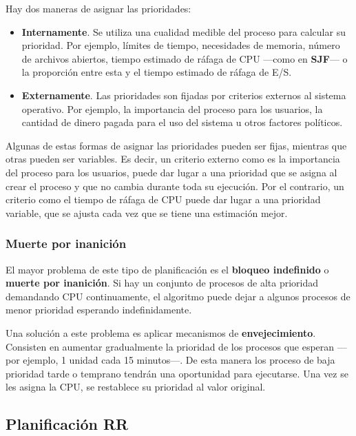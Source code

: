 Hay dos maneras de asignar las prioridades:

\begin{itemize}
\item
  \textbf{Internamente}. Se utiliza una cualidad medible del proceso
  para calcular su prioridad. Por ejemplo, límites de tiempo,
  necesidades de memoria, número de archivos abiertos, tiempo estimado
  de ráfaga de CPU ---como en \textbf{SJF}--- o la proporción entre esta
  y el tiempo estimado de ráfaga de E/S.
\item
  \textbf{Externamente}. Las prioridades son fijadas por criterios
  externos al sistema operativo. Por ejemplo, la importancia del proceso
  para los usuarios, la cantidad de dinero pagada para el uso del
  sistema u otros factores políticos.
\end{itemize}

Algunas de estas formas de asignar las prioridades pueden ser fijas,
mientras que otras pueden ser variables. Es decir, un criterio externo
como es la importancia del proceso para los usuarios, puede dar lugar a
una prioridad que se asigna al crear el proceso y que no cambia durante
toda su ejecución. Por el contrario, un criterio como el tiempo de
ráfaga de CPU puede dar lugar a una prioridad variable, que se ajusta
cada vez que se tiene una estimación mejor.

\subsubsection{Muerte por inanición}\label{_muerte_por_inaniciuxf3n}

El mayor problema de este tipo de planificación es el \textbf{bloqueo
indefinido}{} o \textbf{{}muerte por inanición}. Si hay un conjunto de
procesos de alta prioridad demandando CPU continuamente, el algoritmo
puede dejar a algunos procesos de menor prioridad esperando
indefinidamente.

Una solución a este problema es aplicar mecanismos de
\textbf{{}envejecimiento}. Consisten en aumentar gradualmente la
prioridad de los procesos que esperan ---por ejemplo, 1 unidad cada 15
minutos---. De esta manera los proceso de baja prioridad tarde o
temprano tendrán una oportunidad para ejecutarse. Una vez se les asigna
la CPU, se restablece su prioridad al valor original.

\subsection{Planificación RR}\label{_planificaciuxf3n_rr}

